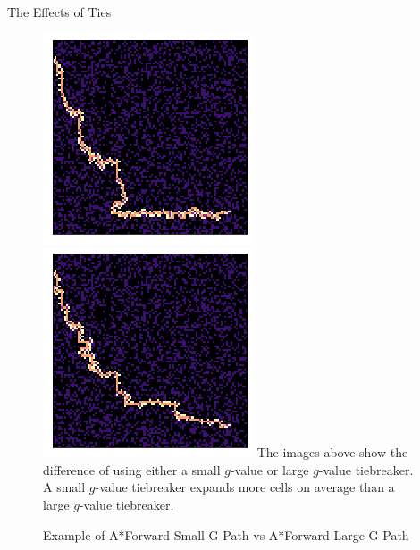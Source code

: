 \documentclass[12pt]{article}
\theoremstyle{definition}
\begin{document}
\begin{onehalfspacing}
\begin{section}{The Effects of Ties}
\begin{figure}[h]
\caption{Example of A*Forward Small G Path vs A*Forward Large G Path}
\includegraphics[scale=.8]{images/ForwardLarge.png}
\includegraphics[scale=.8]{images/ForwardSmall.png}
The images above show the difference of using either a small $g$-value or large $g$-value tiebreaker. A small $g$-value tiebreaker expands more cells on average than a large $g$-value tiebreaker. 
\end{figure}




\end{section}


\end{onehalfspacing}
\end{document}
